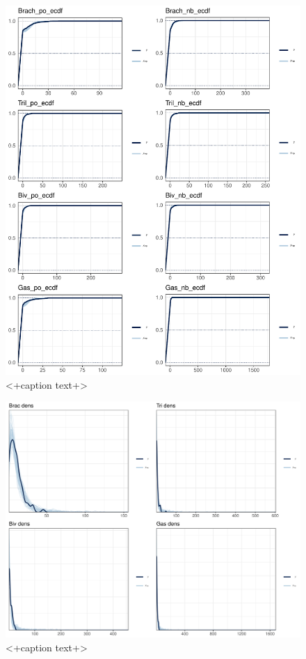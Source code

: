 \documentclass[12pt,letterpaper]{article}
\begin{document}
\begin{figure}[ht]
  \centering
  \includegraphics[width=\textwidth,height=0.5\textheight,keepaspectratio=true]{figure/ppc_ecdf}
  \caption{<+caption text+>}
  \label{fig:<+label+>}
\end{figure}

\begin{figure}[ht]
  \centering
  \includegraphics[width=\textwidth,height=0.5\textheight,keepaspectratio=true]{figure/ppc_dens}
  \caption{<+caption text+>}
  \label{fig:<+label+>}
\end{figure}
\end{document}
